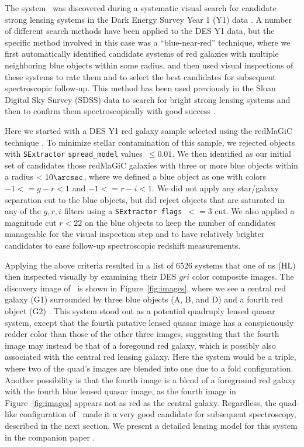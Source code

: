 \documentclass[twocolumn]{aastex6}
\begin{document}
The system \sysname\ was discovered during a systematic visual search for 
candidate strong lensing systems in the Dark Energy Survey 
Year 1 (Y1) data \citep{diehl14}.
A number of different search methods have been applied to the DES Y1 data,
but the specific method involved in this case was a ``blue-near-red'' 
technique, where we first automatically identified candidate systems of
red galaxies with multiple neighboring blue objects within some radius, 
and then used visual inspections of these systems to rate them and
to select the best candidates for subsequent spectroscopic follow-up.
This method has been used previously in the Sloan Digital Sky 
Survey (SDSS) data to search for bright strong lensing systems and then 
to confirm them spectroscopically with good success \citep[e.g.,][]{diehl09,belokurov09}.

Here we started with a DES Y1 red galaxy sample selected using the redMaGiC 
technique \citep{redmagic}.
To minimize stellar contamination of this sample, we rejected objects
with {\tt SExtractor} \citep{sextractor} {\tt spread\_model}\citep{desai12,bouy13} values~$ \leq 0.01$.
We then identified as our initial set of candidates those redMaGiC galaxies
with three or more blue objects within a radius $< 10\arcsec$, where we defined
a blue object as one with colors $-1 <= g-r < 1$ and $-1 <= r-i < 1$.
We did not apply any star/galaxy separation cut to the blue objects,
but did reject objects that are saturated in any of the $g,r,i$ filters
using a {\tt SExtractor flags}~$ <= 3$ cut.
We also applied a magnitude cut $r < 22$ on the blue objects to
keep the number of candidates manageable for the visual inspection step
and to have relatively brighter candidates to ease follow-up
spectroscopic redshift measurements.

Applying the above criteria resulted in a list of 6526 systems that one
of us (HL) then inspected visually by examining their DES $gri$ color composite
images.
The discovery image of \sysname\ is shown in Figure~\ref{fig:images},
where we see a central red galaxy (G1) surrounded by 
three blue objects (A, B, and D) and a fourth red object (G2)
\citep[objects labeled as in][]{agn17}.
This system stood out as a potential quadruply lensed quasar system,
except that the fourth putative lensed quasar image has a
conspicuously redder color than those of the other three images, 
suggesting that the fourth image may instead be that of a foregound
red galaxy, which is possibly also associated with the central red lensing
galaxy.  
Here the system would be a triple, where two of the quad's images are blended 
into one due to a fold configuration.
Another possibility is that the fourth image is a blend of a foreground red
galaxy with the fourth blue lensed quasar image, as the fourth
image in Figure~\ref{fig:images} appears not as red as the central galaxy.
Regardless, the quad-like configuration of \sysname\ made it a very 
good candidate for subsequent spectroscopy, described in the next section.
We present a detailed lensing model for this system in the companion paper
\cite{agn17}.
\end{document}

